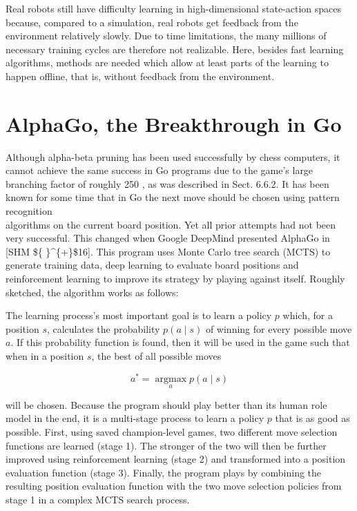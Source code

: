\documentclass[10pt]{book}
\begin{document}
Real robots still have difficulty learning in high-dimensional state-action spaces because, compared to a simulation, real robots get feedback from the environment relatively slowly. Due to time limitations, the many millions of necessary training cycles are therefore not realizable. Here, besides fast learning algorithms, methods are needed which allow at least parts of the learning to happen offline, that is, without feedback from the environment.

\section{AlphaGo, the Breakthrough in Go}
Although alpha-beta pruning has been used successfully by chess computers, it cannot achieve the same success in Go programs due to the game's large branching factor of roughly 250 , as was described in Sect. 6.6.2. It has been known for some time that in Go the next move should be chosen using pattern recognition\\[0pt]
algorithms on the current board position. Yet all prior attempts had not been very successful. This changed when Google DeepMind presented AlphaGo in [SHM \$\{ \}\^{}\{+\}\$16]. This program uses Monte Carlo tree search (MCTS) to generate training data, deep learning to evaluate board positions and reinforcement learning to improve its strategy by playing against itself. Roughly sketched, the algorithm works as follows:


The learning process's most important goal is to learn a policy $p$ which, for a position $s$, calculates the probability $p(a \mid s)$ of winning for every possible move $a$. If this probability function is found, then it will be used in the game such that when in a position $s$, the best of all possible moves

$$
a^{*}=\underset{a}{\operatorname{argmax}} p(a \mid s)
$$

will be chosen. Because the program should play better than its human role model in the end, it is a multi-stage process to learn a policy $p$ that is as good as possible. First, using saved champion-level games, two different move selection functions are learned (stage 1). The stronger of the two will then be further improved using reinforcement learning (stage 2) and transformed into a position evaluation function (stage 3). Finally, the program plays by combining the resulting position evaluation function with the two move selection policies from stage 1 in a complex MCTS search process.
\end{document}
